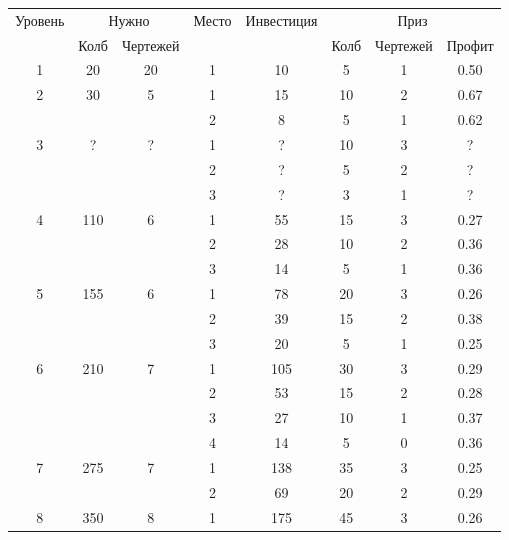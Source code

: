 \begin{longtable}[c]{|c|c|c|c|c|c|c|c|}
    \hline
    \multirow{ 2}{*}{\small Уровень} &
    \multicolumn{2}{|c|}{\small Нужно} &
    \multirow{ 2}{*}{\small Место} & 
    \multirow{ 2}{*}{\small Инвестиция} & 
    \multicolumn{3}{|c|}{\small Приз} \\\cline{2-3}\cline{6-8}
    &
    {\small Колб} & 
    {\small Чертежей} & 
    & &
    {\small Колб} & 
    {\small Чертежей} & 
    {\small Профит}
    \\\hline\endhead
    \multirow{1}{*}{1} & \multirow{1}{*}{20} & \multirow{1}{*}{20} & 1 & 10 & 5 & 1 & 0.50 \\\hline
    \multirow{2}{*}{2} & \multirow{2}{*}{30} & \multirow{2}{*}{5} & 1 & 15 & 10 & 2 & 0.67 \\\cline{4-8}
    & & & 2 & 8 & 5 & 1 & 0.62 \\\hline
    \multirow{3}{*}{3} & \multirow{3}{*}{?} & \multirow{3}{*}{?} & 1 & ? & 10 & 3 & ? \\\cline{4-8}
    & & & 2 & ? & 5 & 2 & ? \\\cline{4-8}
    & & & 3 & ? & 3 & 1 & ? \\\hline
    \multirow{3}{*}{4} & \multirow{3}{*}{110} & \multirow{3}{*}{6} & 1 & 55 & 15 & 3 & 0.27 \\\cline{4-8}
    & & & 2 & 28 & 10 & 2 & 0.36 \\\cline{4-8}
    & & & 3 & 14 & 5 & 1 & 0.36 \\\hline
    \multirow{3}{*}{5} & \multirow{3}{*}{155} & \multirow{3}{*}{6} & 1 & 78 & 20 & 3 & 0.26 \\\cline{4-8}
    & & & 2 & 39 & 15 & 2 & 0.38 \\\cline{4-8}
    & & & 3 & 20 & 5 & 1 & 0.25 \\\hline
    \multirow{4}{*}{6} & \multirow{4}{*}{210} & \multirow{4}{*}{7} & 1 & 105 & 30 & 3 & 0.29 \\\cline{4-8}
    & & & 2 & 53 & 15 & 2 & 0.28 \\\cline{4-8}
    & & & 3 & 27 & 10 & 1 & 0.37 \\\cline{4-8}
    & & & 4 & 14 & 5 & 0 & 0.36 \\\hline
    \multirow{2}{*}{7} & \multirow{2}{*}{275} & \multirow{2}{*}{7} & 1 & 138 & 35 & 3 & 0.25 \\\cline{4-8}
    & & & 2 & 69 & 20 & 2 & 0.29 \\\hline
    \multirow{4}{*}{8} & \multirow{4}{*}{350} & \multirow{4}{*}{8} & 1 & 175 & 45 & 3 & 0.26 \\\cline{4-8}

\end{longtable}
